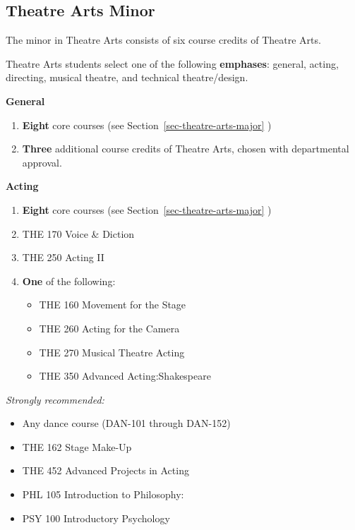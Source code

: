 \documentclass[
  letterpaper,
]{scrbook}
\providecommand{\tightlist}{%
  \setlength{\itemsep}{0pt}\setlength{\parskip}{0pt}}
\begin{document}
\subsection{Theatre Arts Minor}\label{theatre-arts-minor}

The minor in Theatre Arts consists of six course credits of Theatre
Arts.

Theatre Arts students select one of the following \textbf{emphases}:
general, acting, directing, musical theatre, and technical
theatre/design.

\textbf{General}

\begin{enumerate}
\def\labelenumi{\arabic{enumi}.}
\item
  \textbf{Eight} core courses (see Section~\ref{sec-theatre-arts-major}
  )
\item
  \textbf{Three} additional course credits of Theatre Arts, chosen with
  departmental approval.
\end{enumerate}

\textbf{Acting}

\begin{enumerate}
\def\labelenumi{\arabic{enumi}.}
\item
  \textbf{Eight} core courses (see Section~\ref{sec-theatre-arts-major}
  )
\item
  THE 170 Voice \& Diction
\item
  THE 250 Acting II
\item
  \textbf{One} of the following:

  \begin{itemize}
  \tightlist
  \item
    THE 160 Movement for the Stage
  \item
    THE 260 Acting for the Camera
  \item
    THE 270 Musical Theatre Acting
  \item
    THE 350 Advanced Acting:Shakespeare
  \end{itemize}
\end{enumerate}

\emph{Strongly recommended:}

\begin{itemize}
\tightlist
\item
  Any dance course (DAN-101 through DAN-152)
\item
  THE 162 Stage Make-Up
\item
  THE 452 Advanced Projects in Acting
\item
  PHL 105 Introduction to Philosophy:
\item
  PSY 100 Introductory Psychology
\end{itemize}
\end{document}
